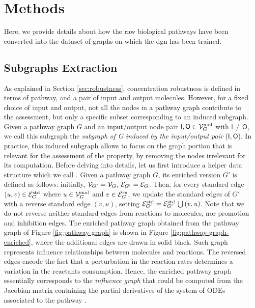 \section{Methods}
Here, we provide details about how the raw biological pathways have been converted into the dataset of graphs on which the \gls{dgn} has been trained.

\subsection{Subgraphs Extraction}\label{sec:subgraphs-extraction}
As explained in Section \ref{sec:robustness}, concentration robustness is defined in terms of pathway, and a pair of input and output molecules. However, for a fixed choice of input and output, not all the nodes in a pathway graph contribute to the assessment, but only a specific subset corresponding to an induced subgraph. Given a pathway graph $G$ and an input/output node pair $\mathsf{I}, \mathsf{O} \in \Cal{V}_G^{\Fun{mol}}$ with $\mathsf{I} \neq \mathsf{O}$, we call this subgraph the \emph{subgraph of G induced by the input/output pair} ($\mathsf{I}, \mathsf{O}$). In practice, this induced subgraph allows to focus on the graph portion that is relevant for the assessment of the property, by removing the nodes irrelevant for its computation. Before delving into details, let us first introduce a helper data structure which we call . Given a pathway graph $G$, its enriched version $G'$ is defined as follows: initially, $\Cal{V}_{G'}=\Cal{V}_G$, $\Cal{E}_{G'}=\Cal{E}_G$. Then, for every standard edge $(u, v) \in \Cal{E}_{G}^{\Fun{std}}$ where $u \in \Cal{V}_{G}^{\Fun{mol}}$ and $v \in \Cal{E}_{G}^{\Fun{rx}}$, we update the standard edges of $G'$ with a reverse standard edge $(v,u)$, setting $\Cal{E}_{G'}^{\Fun{std}} = \Cal{E}_{G'}^{\Fun{std}} \Union (v, u)$. Note that we do not reverse neither standard edges from reactions to molecules, nor promotion and inhibition edges. The enriched pathway graph obtained from the pathway graph of Figure \ref{fig:pathway-graph} is shown in Figure \ref{fig:pathway-graph-enriched}, where the additional edges are drawn in solid black. Such graph represents influence relationships between molecules and reactions. The reversed edges encode the fact that a perturbation in the reaction rates determines a variation in the reactants consumption. Hence, the enriched pathway graph essentially corresponds to the \emph{influence graph} that could be computed from the Jacobian matrix containing the partial derivatives of the system of ODEs associated to the pathway \citep{fages2008influencegraph}.
